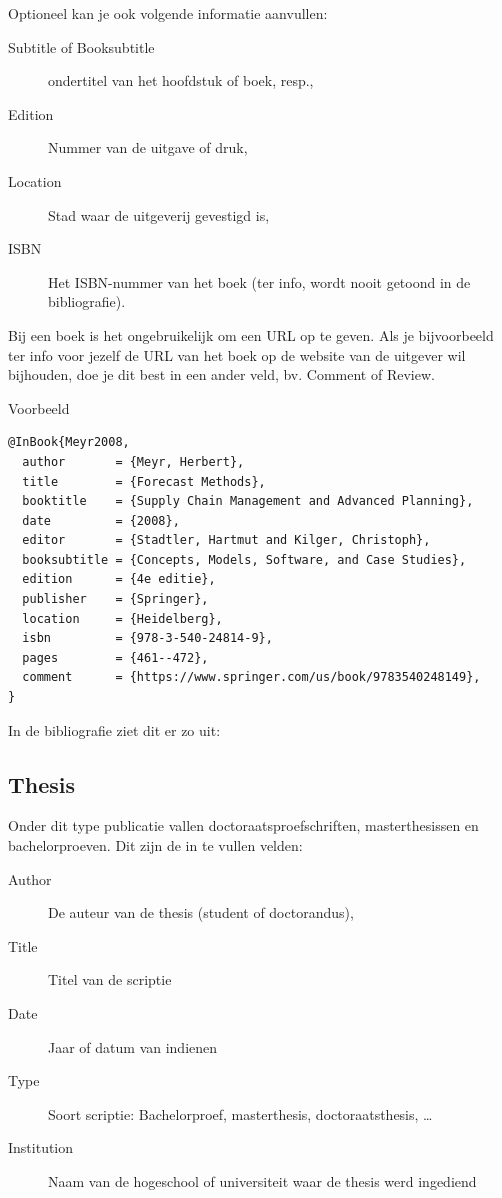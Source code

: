 Optioneel kan je ook volgende informatie aanvullen:

\begin{description}
  \item[Subtitle of Booksubtitle] ondertitel van het hoofdstuk of boek, resp.,
  \item[Edition] Nummer van de uitgave of druk,
  \item[Location] Stad waar de uitgeverij gevestigd is,
  \item[ISBN] Het ISBN-nummer van het boek (ter info, wordt nooit getoond in de bibliografie).
\end{description}

Bij een boek is het ongebruikelijk om een URL op te geven. Als je bijvoorbeeld ter info voor jezelf de URL van het boek op de website van de uitgever wil bijhouden, doe je dit best in een ander veld, bv. Comment of Review.

Voorbeeld
\begin{verbatim}
@InBook{Meyr2008,
  author       = {Meyr, Herbert},
  title        = {Forecast Methods},
  booktitle    = {Supply Chain Management and Advanced Planning},
  date         = {2008},
  editor       = {Stadtler, Hartmut and Kilger, Christoph},
  booksubtitle = {Concepts, Models, Software, and Case Studies},
  edition      = {4e editie},
  publisher    = {Springer},
  location     = {Heidelberg},
  isbn         = {978-3-540-24814-9},
  pages        = {461--472},
  comment      = {https://www.springer.com/us/book/9783540248149},
}
\end{verbatim}

In de bibliografie ziet dit er zo uit:

\subsection{Thesis}%
\label{ssec:thesis}

Onder dit type publicatie vallen doctoraatsproefschriften, masterthesissen en bachelorproeven. Dit zijn de in te vullen velden:

\begin{description}
  \item[Author] De auteur van de thesis (student of doctorandus),
  \item[Title] Titel van de scriptie
  \item[Date] Jaar of datum van indienen
  \item[Type] Soort scriptie: Bachelorproef, masterthesis, doctoraatsthesis, \ldots
  \item[Institution] Naam van de hogeschool of universiteit waar de thesis werd ingediend
\end{description}

